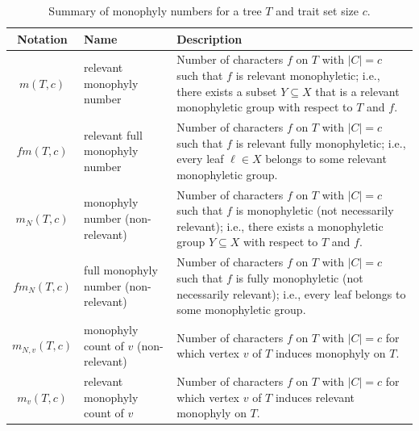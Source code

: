 \documentclass{amsart}
\theoremstyle{definition}
\begin{document}
\begin{table}[h]
\centering
\caption{Summary of monophyly numbers for a tree $T$ and trait set size $c$.}
\label{tab:mono-counts}
\begin{tabular}{|c|l|p{8cm}|}
\hline
\textbf{Notation} & \textbf{Name} & \textbf{Description} \\
\hline
$m(T,c)$ & relevant monophyly number & Number of characters $f$ on $T$ with $|C|=c$ such that $f$ is relevant monophyletic; i.e., there exists a subset $Y \subseteq X$ that is a relevant monophyletic group with respect to $T$ and $f$. \\
\hline
$fm(T,c)$ & relevant full monophyly number & Number of characters $f$ on $T$ with $|C|=c$ such that $f$ is relevant fully monophyletic; i.e., every leaf $\ell \in X$ belongs to some relevant monophyletic group. \\
\hline
$m_N(T,c)$ & monophyly number (non-relevant) & Number of characters $f$ on $T$ with $|C|=c$ such that $f$ is monophyletic (not necessarily relevant); i.e., there exists a monophyletic group $Y \subseteq X$ with respect to $T$ and $f$. \\
\hline
$fm_N(T,c)$ & full monophyly number (non-relevant) & Number of characters $f$ on $T$ with $|C|=c$ such that $f$ is fully monophyletic (not necessarily relevant); i.e., every leaf belongs to some monophyletic group. \\
\hline
$m_{N,v}(T,c)$ & monophyly count of $v$ (non-relevant)& Number of characters $f$ on $T$ with $|C|=c$ for which vertex $v$ of $T$ induces monophyly on $T$. \\
\hline
$m_v(T,c)$ & relevant monophyly count of $v$ & Number of characters $f$ on $T$ with $|C|=c$ for which vertex $v$ of $T$ induces relevant monophyly on $T$. \\
\hline
\end{tabular}
\end{table}



\color{black}
\end{document}
